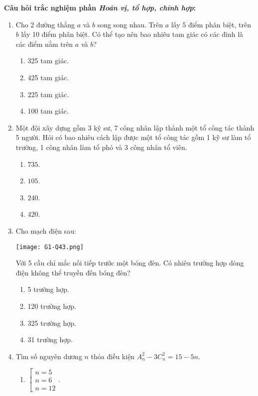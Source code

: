 \noindent\textbf{Câu hỏi trắc nghiệm phần \textit{Hoán vị, tổ hợp, chỉnh hợp}:}\par
\begin{enumerate}[label=\textbf{Câu \arabic*.},align=left,left=0cm..0cm,itemindent=*]
	\item Cho 2 đường thẳng $a$ và $b$ song song nhau. Trên $a$ lấy 5 điểm phân biệt, trên $b$ lấy 10 điểm phân biệt. Có thể tạo nên bao nhiêu tam giác có các đỉnh là các điểm nằm trên $a$ và $b$?
	\begin{enumerate}[label=\textbf{\Alph*.},align=left,left=1cm..0cm,itemindent=*]
		\item 325 tam giác. \item 425 tam giác. \item 225 tam giác. \item 100 tam giác.
	\end{enumerate}
	\item Một đội xây dựng gồm 3 kỹ sư, 7 công nhân lập thành một tổ công tác thành 5 người. Hỏi có bao nhiêu cách lập được một tổ công tác gồm 1 kỹ sư làm tổ trưởng, 1 công nhân làm tổ phó và 3 công nhân tổ viên.
	\begin{enumerate}[label=\textbf{\Alph*.},align=left,left=1cm..0cm,itemindent=*]
		\item $735$. \item $105$. \item $240$. \item $420$.
	\end{enumerate}
	\item Cho mạch điện sau:\par
	{\centering\texttt{[image: G1-Q43.png]}\par}
	Với 5 cầu chỉ mắc nối tiếp trước một bóng đèn. Có nhiêu trường hợp dòng điện không thể truyền đến bóng đèn?
	\begin{enumerate}[label=\textbf{\Alph*.},align=left,left=1cm..0cm,itemindent=*]
		\item 5 trường hợp. \item 120 trường hợp. \item 325 trường hợp. \item 31 trường hợp.
	\end{enumerate}
	\item Tìm số nguyên dương $n$ thỏa điều kiện $A_{n}^{2}-3C_{n}^{2}=15-5n$.
	\begin{enumerate}[label=\textbf{\Alph*.},align=left,left=1cm..0cm,itemindent=*]
		\item $\left[ \begin{array}{l} n=5\\ n=6\\ n=12 \end{array} \right.$.

\end{enumerate}
\end{enumerate}
